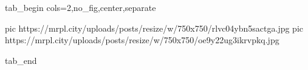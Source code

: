  
 
 
 
 


\ifcmt
  tab_begin cols=2,no_fig,center,separate

     pic https://mrpl.city/uploads/posts/resize/w/750x750/rlvc04ybn5sactga.jpg
     pic https://mrpl.city/uploads/posts/resize/w/750x750/oe9y22ug3ikrvpkq.jpg

  tab_end
\fi
